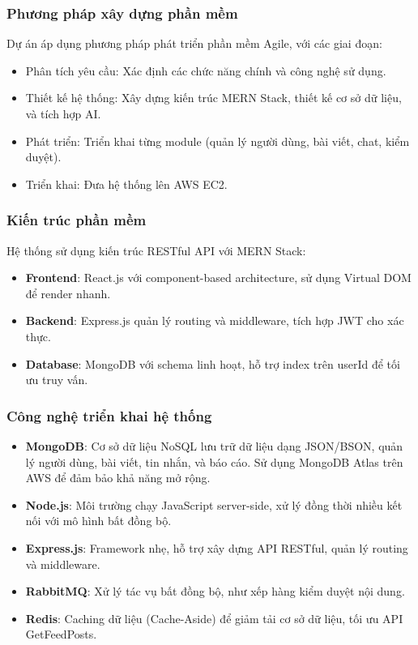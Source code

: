 \subsubsection{Phương pháp xây dựng phần mềm}
Dự án áp dụng phương pháp phát triển phần mềm Agile, với các giai đoạn:
\begin{itemize}
    \item Phân tích yêu cầu: Xác định các chức năng chính và công nghệ sử dụng.
    \item Thiết kế hệ thống: Xây dựng kiến trúc MERN Stack, thiết kế cơ sở dữ liệu, và tích hợp AI.
    \item Phát triển: Triển khai từng module (quản lý người dùng, bài viết, chat, kiểm duyệt).
    \item Triển khai: Đưa hệ thống lên AWS EC2.
\end{itemize}

\subsubsection{Kiến trúc phần mềm}
Hệ thống sử dụng kiến trúc RESTful API với MERN Stack:
\begin{itemize}
    \item \textbf{Frontend}: React.js với component-based architecture, sử dụng Virtual DOM để render nhanh.
    \item \textbf{Backend}: Express.js quản lý routing và middleware, tích hợp JWT cho xác thực.
    \item \textbf{Database}: MongoDB với schema linh hoạt, hỗ trợ index trên userId để tối ưu truy vấn.
\end{itemize}

\subsubsection{Công nghệ triển khai hệ thống}
\begin{itemize}
    \item \textbf{MongoDB}: Cơ sở dữ liệu NoSQL lưu trữ dữ liệu dạng JSON/BSON, quản lý người dùng, bài viết, tin nhắn, và báo cáo. Sử dụng MongoDB Atlas trên AWS để đảm bảo khả năng mở rộng.
    \item \textbf{Node.js}: Môi trường chạy JavaScript server-side, xử lý đồng thời nhiều kết nối với mô hình bất đồng bộ.
    \item \textbf{Express.js}: Framework nhẹ, hỗ trợ xây dựng API RESTful, quản lý routing và middleware.
    \item \textbf{RabbitMQ}: Xử lý tác vụ bất đồng bộ, như xếp hàng kiểm duyệt nội dung.
    \item \textbf{Redis}: Caching dữ liệu (Cache-Aside) để giảm tải cơ sở dữ liệu, tối ưu API GetFeedPosts.
\end{itemize}

